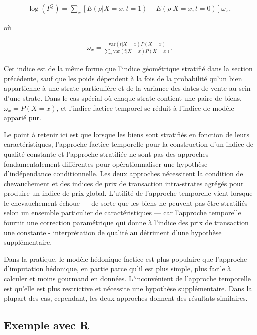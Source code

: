 \documentclass[]{article}
\begin{document}
\begin{align*}
\log (I^{Q}) = \sum_{x} [E(\rho | X = x, t = 1) - E(\rho | X = x, t = 0)] \omega_{x},
\end{align*}

où

\begin{align*}
\omega_{x} = \frac{\text{var}(t | X = x) P(X = x)}{\sum_{x} \text{var}(t | X = x) P(X = x)}.
\end{align*}

Cet indice est de la même forme que l'indice géométrique stratifié dans la section précédente, sauf que les poids dépendent à la fois de la probabilité qu'un bien appartienne à une strate particulière et de la variance des dates de vente au sein d'une strate. Dans le cas spécial où chaque strate contient une paire de biens, \(\omega_{x} = P(X = x)\), et l'indice factice temporel se réduit à l'indice de modèle apparié pur.

Le point à retenir ici est que lorsque les biens sont stratifiés en fonction de leurs caractéristiques, l'approche factice temporelle pour la construction d'un indice de qualité constante et l'approche stratifiée ne sont pas des approches fondamentalement différentes pour opérationnaliser une hypothèse d'indépendance conditionnelle. Les deux approches nécessitent la condition de chevauchement et des indices de prix de transaction intra-strates agrégés pour produire un indice de prix global. L'utilité de l'approche temporelle vient lorsque le chevauchement échoue --- de sorte que les biens ne peuvent pas être stratifiés selon un ensemble particulier de caractéristiques --- car l'approche temporelle fournit une correction paramétrique qui donne à l'indice des prix de transaction une constante - interprétation de qualité au détriment d'une hypothèse supplémentaire.

Dans la pratique, le modèle hédonique factice est plus populaire que l'approche d'imputation hédonique, en partie parce qu'il est plus simple, plus facile à calculer et moins gourmand en données. L'inconvénient de l'approche temporelle est qu'elle est plus restrictive et nécessite une hypothèse supplémentaire. Dans la plupart des cas, cependant, les deux approches donnent des résultats similaires.

\hypertarget{exemple-avec-r-3}{%
\subsection{Exemple avec R}\label{exemple-avec-r-3}}
\end{document}
